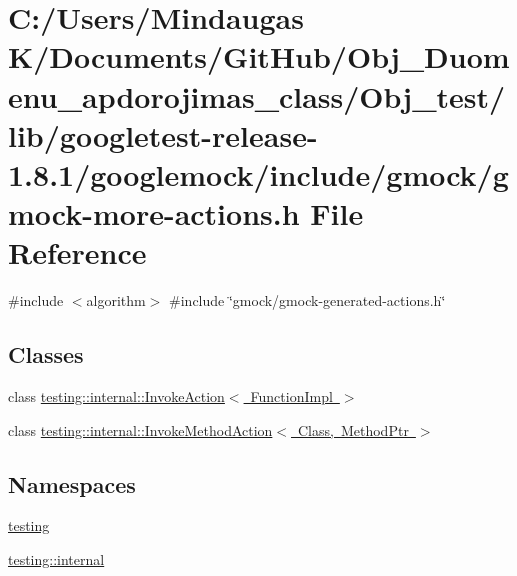 \hypertarget{_obj__test_2lib_2googletest-release-1_88_81_2googlemock_2include_2gmock_2gmock-more-actions_8h}{}\section{C\+:/\+Users/\+Mindaugas K/\+Documents/\+Git\+Hub/\+Obj\+\_\+\+Duomenu\+\_\+apdorojimas\+\_\+class/\+Obj\+\_\+test/lib/googletest-\/release-\/1.8.1/googlemock/include/gmock/gmock-\/more-\/actions.h File Reference}
\label{_obj__test_2lib_2googletest-release-1_88_81_2googlemock_2include_2gmock_2gmock-more-actions_8h}
{\ttfamily \#include $<$algorithm$>$}\newline
{\ttfamily \#include \char`\"{}gmock/gmock-\/generated-\/actions.\+h\char`\"{}}\newline
\subsection*{Classes}
\begin{DoxyCompactItemize}
\item 
class \mbox{\hyperlink{classtesting_1_1internal_1_1_invoke_action}{testing\+::internal\+::\+Invoke\+Action$<$ Function\+Impl $>$}}
\item 
class \mbox{\hyperlink{structtesting_1_1internal_1_1_invoke_method_action}{testing\+::internal\+::\+Invoke\+Method\+Action$<$ Class, Method\+Ptr $>$}}
\end{DoxyCompactItemize}
\subsection*{Namespaces}
\begin{DoxyCompactItemize}
\item 
 \mbox{\hyperlink{namespacetesting}{testing}}
\item 
 \mbox{\hyperlink{namespacetesting_1_1internal}{testing\+::internal}}
\end{DoxyCompactItemize}
